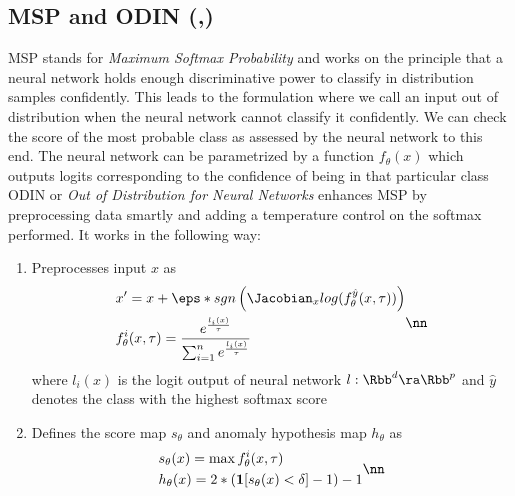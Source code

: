 \documentclass[11pt]{report}
\begin{document}
\subsection{MSP and ODIN (\cite{HendrycksGimpel2017},\cite{LiangLiSrikant2017})}
MSP stands for \emph{Maximum Softmax Probability} and works on the principle that a neural network holds enough discriminative power to classify in distribution samples confidently. This leads to the formulation where we call an input out of distribution when the neural network cannot classify it confidently. We can check the score of the most probable class as assessed by the neural network to this end. The neural network can be parametrized by a function \(f_\theta(x)\) which outputs logits corresponding to the confidence of being in that particular class
\vspace{1mm}
\\ODIN or \emph{Out of Distribution for Neural Networks} enhances MSP by preprocessing data smartly and adding a temperature control on the softmax performed. It works in the following way:
\vspace{1mm}
\begin{enumerate}
    \item \label{mpp:gen_0} Preprocesses input \(x\) as
    \begin{align}
        \begin{aligned}
          & x'=x+\eps * sgn \left( \Jacobian_x log(f_\theta^{\hat{y}}(x,\tau)) \right)\\
          & f_\theta^i(x,\tau) = \frac{e^{\frac{l_i(x)}{\tau}}}{\sum_{i=1}^n e^{\frac{l_i(x)}{\tau}}}
        \end{aligned} \nn
    \end{align}
where \(l_i(x)\) is the logit output of neural network \(l: \Rbb^d \ra \Rbb^p \) and \(\hat{y}\) denotes the class with the highest softmax score


\item \label{mpp:gen_1} Defines the score map \(s_\theta\) and anomaly hypothesis map \(h_\theta\) as 
     \begin{align}
        \begin{aligned}
          & s_\theta(x)= \max f_\theta^i(x,\tau) \\
          & h_\theta(x)= 2 * \left( \mathbf{1}[s_\theta(x) < \delta] - 1 \right) -1
        \end{aligned} \nn
    \end{align}
\end{enumerate}
\end{document}
